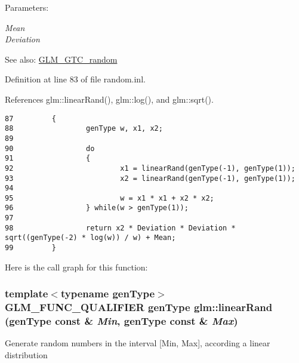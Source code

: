 \begin{Desc}
\item[Parameters:]
\begin{description}
\item[{\em Mean}]\item[{\em Deviation}]\end{description}
\end{Desc}
\begin{Desc}
\item[See also:]\hyperlink{group__gtc__random}{GLM\_\-GTC\_\-random} \end{Desc}


Definition at line 83 of file random.inl.

References glm::linearRand(), glm::log(), and glm::sqrt().

\begin{Code}\begin{verbatim}87         {
88                 genType w, x1, x2;
89         
90                 do
91                 {
92                         x1 = linearRand(genType(-1), genType(1));
93                         x2 = linearRand(genType(-1), genType(1));
94                 
95                         w = x1 * x1 + x2 * x2;
96                 } while(w > genType(1));
97         
98                 return x2 * Deviation * Deviation * sqrt((genType(-2) * log(w)) / w) + Mean;
99         }
\end{verbatim}
\end{Code}




Here is the call graph for this function:\hypertarget{group__gtc__random_gb955b990407d8d4b62cfe2a2a89d9492}{
\subsubsection[linearRand]{\setlength{\rightskip}{0pt plus 5cm}template$<$typename genType$>$ GLM\_\-FUNC\_\-QUALIFIER genType glm::linearRand (genType const \& {\em Min}, \/  genType const \& {\em Max})}}
\label{group__gtc__random_gb955b990407d8d4b62cfe2a2a89d9492}


Generate random numbers in the interval \mbox{[}Min, Max\mbox{]}, according a linear distribution

